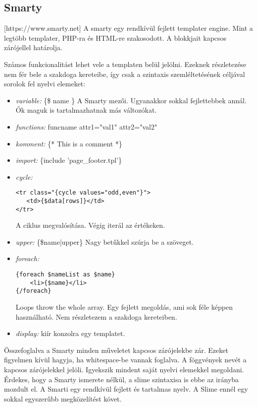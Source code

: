 \subsection{Smarty}
[https://www.smarty.net]
A smarty egy rendkívül fejlett templater engine.
Mint a legtöbb templater, PHP-ra és  HTML-re szakosodott.
A blokkjait kapcsos zárójellel határolja.

Számos funkcionalitást lehet vele a templaten belül jelölni.
Ezeknek részletezése nem fér bele a szakdoga kereteibe, így csak a szintaxis szemléltetésének céljával sorolok fel nyelvi elemeket:

\begin{itemize}
\item \emph{variable: }
\{\$ name \}
A Smarty mezői.
Ugyanakkor sokkal fejlettebbek annál.
Ők maguk is tartalmazhatnak más változókat. 
\item \emph{functions: }
{funcname attr1="val1" attr2="val2"}
\item \emph{komment: } 
\{* This is a comment *\}
\item \emph{import: } 
\{include 'page\_footer.tpl'\}
\item \emph{cycle: }
\begin{verbatim}
<tr class="{cycle values="odd,even"}">
   <td>{$data[rows]}</td>
</tr>
\end{verbatim}
A ciklus megvalósítása. 
Végig iterál az értékeken.
\item \emph{upper: } 
\{\$name|upper\}
Nagy betűkkel szúrja be a szöveget.
\item \emph{foreach: } 
\begin{verbatim}
{foreach $nameList as $name}
    <li>{$name}</li>
{/foreach}
\end{verbatim}
Loops throw the whole array.
Egy fejlett megoldás, ami sok féle képpen használható.
Nem részletezem a szakdoga kereteiben.
\item \emph{display: } 
kiír konzolra egy templatet.
\end{itemize}

Összefoglalva a Smarty minden műveletet kapcsos zárójelekbe zár.
Ezeket figyelmen kívül hagyja, ha whitespace-be vannak foglalva.
A föggvények nevét a kapcsos zárójelekkel jelöli.
Igyekszik mindent saját nyelvi elemekkel megoldani.
Érdekes, hogy a Smarty ismerete nélkül, a slime szintaxisa is ebbe az irányba mozdult el.
A Smarti egy rendkívül fejlett és tartalmas nyelv.
A Slime ennél egy sokkal egyszerűbb megközelítést követ.


